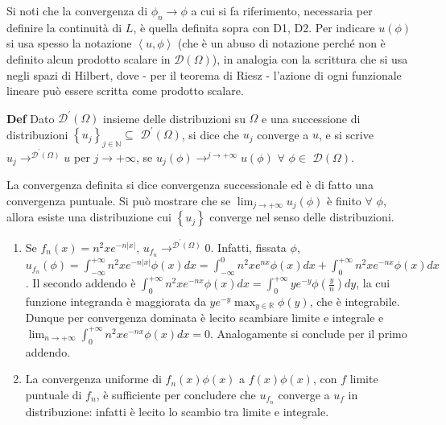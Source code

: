 \documentclass{article}
\begin{document}
Si noti che la convergenza di $\phi _{n}\rightarrow \phi $ a cui si fa
riferimento, necessaria per definire la continuit\`{a} di $L$, \`{e} quella
definita sopra con D1, D2. Per indicare $u\left( \phi \right) $ si usa
spesso la notazione $\left\langle u,\phi \right\rangle $ (che \`{e} un abuso
di notazione perch\'{e} non \`{e} definito alcun prodotto scalare in $%
\mathcal{D}\left( \Omega \right) $), in analogia con la scrittura che si usa
negli spazi di Hilbert, dove - per il teorema di Riesz - l'azione di ogni
funzionale lineare pu\`{o} essere scritta come prodotto scalare.

\textbf{Def} Dato $\mathcal{D}^{\prime }\left( \Omega \right) $ insieme
delle distribuzioni su $\Omega $ e una successione di distribuzioni $\left\{
u_{j}\right\} _{j\in 
\mathbb{N}
}\subseteq $ $\mathcal{D}^{\prime }\left( \Omega \right) $, si dice che $%
u_{j}$ converge a $u$, e si scrive $u_{j}\rightarrow ^{\mathcal{D}^{\prime
}\left( \Omega \right) }u$ per $j\rightarrow +\infty $, se $u_{j}\left( \phi
\right) \rightarrow ^{j\rightarrow +\infty }u\left( \phi \right) $ $\forall $
$\phi \in $ $\mathcal{D}\left( \Omega \right) $.

La convergenza definita si dice convergenza successionale ed \`{e} di fatto
una convergenza puntuale. Si pu\`{o} mostrare che se $\lim_{j\rightarrow
+\infty }u_{j}\left( \phi \right) $ \`{e} finito $\forall $ $\phi $, allora
esiste una distribuzione cui $\left\{ u_{j}\right\} $ converge nel senso
delle distribuzioni. 

\begin{enumerate}
\item Se $f_{n}\left( x\right) =n^{2}xe^{-n\left\vert x\right\vert }$, $%
u_{f_{n}}\rightarrow ^{\mathcal{D}^{\prime }\left( \Omega \right) }0$.
Infatti, fissata $\phi $, $u_{f_{n}}\left( \phi \right) =\int_{-\infty
}^{+\infty }n^{2}xe^{-n\left\vert x\right\vert }\phi \left( x\right)
dx=\int_{-\infty }^{0}n^{2}xe^{nx}\phi \left( x\right) dx+\int_{0}^{+\infty
}n^{2}xe^{-nx}\phi \left( x\right) dx$. Il secondo addendo \`{e} $%
\int_{0}^{+\infty }n^{2}xe^{-nx}\phi \left( x\right) dx=\int_{0}^{+\infty
}ye^{-y}\phi \left( \frac{y}{n}\right) dy$, la cui funzione integranda \`{e}
maggiorata da $ye^{-y}\max_{y\in 
\mathbb{R}
}\phi \left( y\right) $, che \`{e} integrabile. Dunque per convergenza
dominata \`{e} lecito scambiare limite e integrale e $\lim_{n\rightarrow
+\infty }\int_{0}^{+\infty }n^{2}xe^{-nx}\phi \left( x\right) dx=0$.
Analogamente si conclude per il primo addendo.

\item La convergenza uniforme di $f_{n}\left( x\right) \phi \left( x\right) $
a $f\left( x\right) \phi \left( x\right) $, con $f$ limite puntuale di $%
f_{n} $, \`{e} sufficiente per concludere che $u_{f_{n}}$ converge a $u_{f}$
in distribuzione: infatti \`{e} lecito lo scambio tra limite e integrale.
\end{enumerate}
\end{document}
